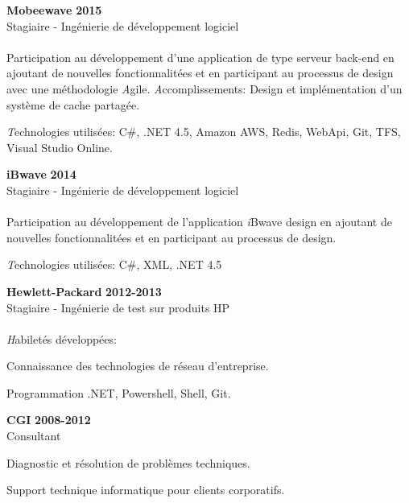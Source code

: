 \documentclass[margin,line]{res}
\begin{document}
\begin{resume}
{\bf Mobeewave} \hfill {\bf 2015}\\
Stagiaire - Ingénierie de développement logiciel\\\\
Participation au développement d'une application de type serveur back-end en ajoutant de nouvelles fonctionnalitées et en participant au processus de design avec une méthodologie {\emph Agile}.
{\emph Accomplissements:} Design et implémentation d'un système de cache partagée. 

{\emph Technologies utilisées:} C\#, .NET 4.5, Amazon AWS, Redis, WebApi, Git, TFS, Visual Studio Online.


{\bf iBwave} \hfill {\bf 2014}\\
Stagiaire - Ingénierie de développement logiciel\\\\
Participation au développement de l'application {\emph iBwave design} en ajoutant de nouvelles fonctionnalitées et en participant au processus de design.

{\emph Technologies utilisées:} C\#, XML, .NET 4.5


{\bf Hewlett-Packard} \hfill {\bf 2012-2013}\\
Stagiaire - Ingénierie de test sur produits HP \\
\\
{\emph Habiletés développées: }
\begin{compactitem}
\item Connaissance des technologies de réseau d'entreprise.
\item Programmation .NET, Powershell, Shell, Git.
\end{compactitem}

{\bf CGI} \hfill {\bf 2008-2012}\\
Consultant
\begin{compactitem}
\item Diagnostic et résolution de problèmes techniques.
\item Support technique informatique pour clients corporatifs.
\end{compactitem}


\end{resume}
\end{document}

